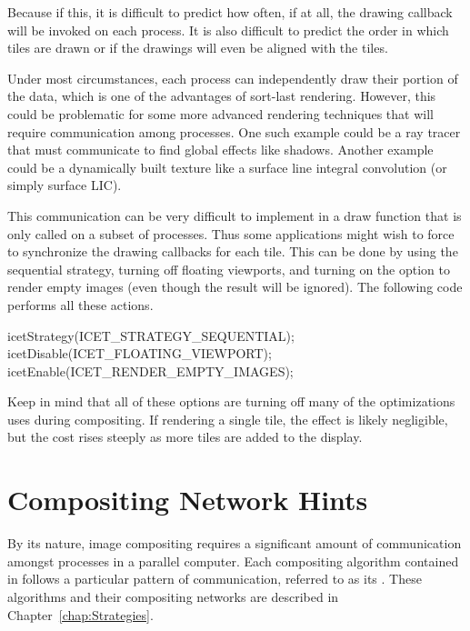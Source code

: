 Because if this, it is difficult to predict how often, if at all, the
drawing callback will be invoked on each process.  It is also difficult to
predict the order in which tiles are drawn or if the drawings will even be
aligned with the tiles.

Under most circumstances, each process can independently draw their portion
of the data, which is one of the advantages of sort-last rendering.
However, this could be problematic for some more advanced rendering
techniques that will require communication among processes.  One such
example could be a ray tracer that must communicate to find global effects
like shadows.  Another example could be a dynamically built texture like a
surface line integral convolution (or simply surface
LIC).

This communication can be very difficult to implement in a draw function
that is only called on a subset of processes.  Thus some applications might
wish to force \IceT to synchronize the drawing callbacks for each tile.
This can be done by using the sequential
strategy, turning off floating
viewports, and turning on the option to render
empty images (even though the result will be ignored).  The following code
performs all these actions.

\begin{code}
icetStrategy(ICET_STRATEGY_SEQUENTIAL);
icetDisable(ICET_FLOATING_VIEWPORT);
icetEnable(ICET_RENDER_EMPTY_IMAGES);
\end{code}

Keep in mind that all of these options are turning off many of the
optimizations \IceT uses during compositing.  If rendering a single tile,
the effect is likely negligible, but the cost rises steeply as more tiles
are added to the display.


\section{Compositing Network Hints}
\label{sec:Customizing_Compositing:Compositing_Network_Hints}

By its nature, image compositing requires a significant amount of
communication amongst processes in a parallel computer.  Each compositing
algorithm contained in \IceT follows a particular pattern of communication,
referred to as its .  These algorithms and
their compositing networks are described in Chapter~\ref{chap:Strategies}.

